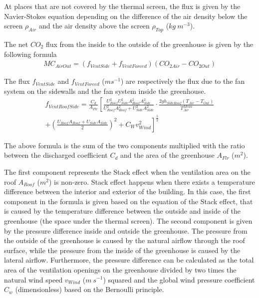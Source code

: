 \documentclass[a4paper]{article}
\numberwithin{equation}{section}
\begin{document}
At places that are not covered by the thermal screen, the flux is given by the Navier-Stokes equation depending on the difference of the air density below the screen \(\rho_{Air}\) and the air density above the screen \(\rho_{Top}\) (\(kg\ m^{-3}\)).

The net \(CO_2\) flux from the inside to the outside of the greenhouse is given by the following formula
\begin{align}
  MC_{AirOut} = (f_{VentSide} + f_{VentForced})(CO_{2 Air} - CO_{2 Out})
\end{align}

The flux \(f_{VentSide}\) and \(f_{VentForced}\) (\(m s^{-1}\)) are respectively the flux due to the fan system on the sidewalls and the fan system inside the greenhouse.
\begin{multline}
  \label{eq:vent_roof_side}
  f_{VentRoofSide} = \frac{C_d}{A_{Flr}} \left[\frac{U_{Roof}^2 U_{Side}^2 A_{Roof}^2 A_{Side}^2}{U_{Roof}^2 A_{Roof}^2 + U_{Side}^2 A_{Side}^2} \cdot \frac{2gh_{SideRoof} (T_{Air} - T_{Out})}{T_{Air}^{Mean}}\right. \\
  + \left.{ \left(\frac{U_{Roof} A_{Roof} + U_{Side} A_{Side}}{2}\right)}^2 + C_W v_{Wind}^2\right]^{\frac{1}{2}}
\end{multline}

The above formula is the sum of the two components multiplied with the ratio between the discharged coefficient \(C_d\) and the area of the greenhouse \(A_{Flr}\) (\(m^2\)).

The first component represents the Stack effect when the ventilation area on the roof \(A_{Roof}\) (\(m^2\)) is non-zero. Stack effect happens when there exists a temperature difference between the interior and exterior of the building. In this case, the first component in the formula is given based on the equation of the Stack effect, that is caused by the temperature difference between the outside and inside of the greenhouse (the space under the thermal screen).
The second component is given by the pressure difference inside and outside the greenhouse. The pressure from the outside of the greenhouse is caused by the natural airflow through the roof surface, while the pressure from the inside of the greenhouse is caused by the lateral airflow. Furthermore, the pressure difference can be calculated as the total area of the ventilation openings on the greenhouse divided by two times the natural wind speed \(v_{Wind}\) (\(m\ s^{-1}\)) squared and the global wind pressure coefficient \(C_w\) (dimensionless) based on the Bernoulli principle.
\end{document}

